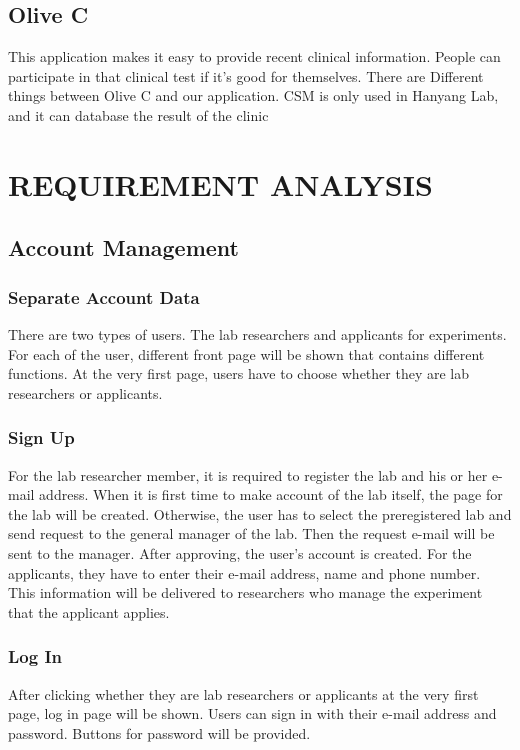 \documentclass[letterpaper, 10 pt, conference]{ieeeconf}  %
\begin{document}
\subsection{Olive C}
This application makes it easy to provide recent clinical information. People can participate in that clinical test if it’s good for themselves. There are Different things between Olive C and our application. CSM  is only used in Hanyang Lab, and it can database the result of the clinic




\section{REQUIREMENT ANALYSIS\\}


\subsection{Account Management}
\subsubsection{Separate Account Data}
There are two types of users. The lab researchers and applicants for experiments. For each of the user, different front page will be shown that contains different functions. At the very first page, users have to choose whether they are lab researchers or applicants. 
\subsubsection{Sign Up}
For the lab researcher member, it is required to register the lab and his or her e-mail address. When it is first time to make account of the lab itself, the page for the lab will be created. Otherwise, the user has to select the preregistered lab and send request to the general manager of the lab. Then the request e-mail will be sent to the manager. After approving, the user's account is created. For the applicants, they have to enter their e-mail address, name and phone number. This information will be delivered to researchers who manage the experiment that the applicant applies. 
\subsubsection{Log In}
After clicking whether they are lab researchers or applicants at the very first page, log in page will be shown. Users can sign in with their e-mail address and password. Buttons for password will be provided.
\end{document}
